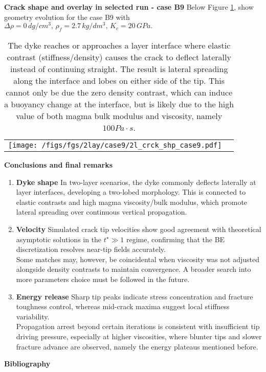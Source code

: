 \documentclass[9pt]{beamer}
\newcommand\Fonttab{\fontsize{12}{7.2}\selectfont}
\begin{document}
\begin{frame}{\textbf{Crack shape and overlay in selected run - case B9}}
Below Figure \ref{fig:10}, show geometry evolution for the case B9 with $\Delta \rho = 0\, dg/cm^3, \, \rho_f=2.7 \, kg/dm^3, \, K_c=20 \, GPa.$
\begin{table}
    \centering
    \begin{tabular}{cc}
        \texttt{[image: /figs/fgs/2lay/case9/2l\_crck\_shp\_case9.pdf]}
    \end{tabular}
    \label{fig:10}
  \caption{The dyke reaches or approaches a layer interface where elastic contrast (stiffness/density) causes the crack to deflect laterally instead of continuing straight. The result is lateral spreading along the interface and lobes on either side of the tip. This cannot only be due the zero density contrast, which can induce a buoyancy change at the interface, but is likely due to the high value of both magma bulk modulus and viscosity, namely $100 Pa \cdot s$.}
\end{table}
\end{frame}


\begin{frame}[allowframebreaks]{\textbf{Conclusions and final remarks}}

\begin{enumerate}
\item \textbf{Dyke shape} In two-layer scenarios, the dyke commonly deflects laterally at layer interfaces, developing a two-lobed morphology. This is connected to elastic contrasts and high magma viscosity/bulk modulus, which promote lateral spreading over continuous vertical propagation.
\item \textbf{Velocity} Simulated crack tip velocities show good agreement with theoretical asymptotic solutions in the $t^{\star} \gg 1$ regime, confirming that the BE discretization resolves near-tip fields accurately.\\ Some matches may, however, be coincidental when viscosity was not adjusted alongside density contrasts to maintain convergence. A broader search into more parameters choice must be followed in the future. 
\item \textbf{Energy release} Sharp tip peaks indicate stress concentration and fracture toughness control, whereas mid-crack maxima suggest local stiffness variability. \\ Propagation arrest beyond certain iterations is consistent with insufficient tip driving pressure, especially at higher viscosities, where blunter tips and slower fracture advance are observed, namely the energy plateaus mentioned before.
\end{enumerate}
\end{frame}

\begin{frame}[allowframebreaks]{\textbf{Bibliography}}
\Fonttab
\scriptsize


\end{frame}
\end{document}
